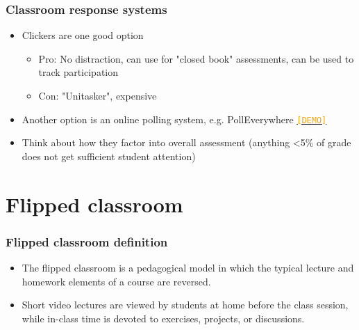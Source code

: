 \documentclass{beamer}
\begin{document}

\begin{frame}
\frametitle{Classroom response systems}

\begin{itemize}

\item Clickers are one good option
\begin{itemize}
\item Pro: No distraction, can use for "closed book" assessments, can be used to track participation
\item Con: "Unitasker", expensive
\end{itemize}

\pause

\item Another option is an online polling system, e.g. PollEverywhere \href{https://pollev.com/minecetinkay621}{\textcolor{orange}{\texttt{[DEMO]}}}

\pause

\item Think about how they factor into overall assessment (anything <5\% of grade does not get sufficient student attention)

\end{itemize}

\end{frame}


\section{Flipped classroom}


\begin{frame}
\frametitle{Flipped classroom definition}

\begin{itemize}

\item The flipped classroom is a pedagogical model in which the typical lecture and homework elements of a course are reversed. 

\pause

\item Short video lectures are viewed by students at home before the class session, while in-class time is devoted to exercises, projects, or discussions.

\end{itemize}

\end{frame}
\end{document}
